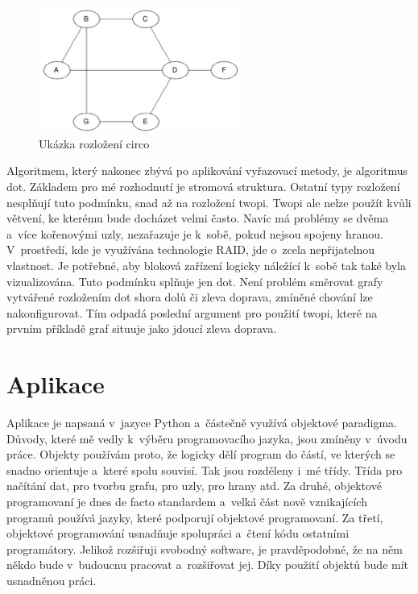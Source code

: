 \documentclass[printed,color,table,oneside,nolot,nolof]{fithesis}
\begin{document}
\begin{figure}[h!]
	\label{Ukázka rozložení circo}
	\caption{Ukázka rozložení circo}
	\centering
	\includegraphics[width=0.6\textwidth]{pictures/circo_example.png} 
\end{figure}

	Algoritmem, který nakonec zbývá po aplikování vyřazovací metody, je algoritmus dot. 
	Základem pro mé rozhodnutí je stromová struktura. Ostatní typy rozložení nesplňují tuto podmínku, snad až na rozložení twopi. Twopi ale nelze použít kvůli větvení,
	ke kterému bude docházet velmi často. Navíc má problémy se dvěma a~více kořenovými uzly, nezařazuje je k~sobě, pokud nejsou spojeny hranou. V~prostředí, kde je využívána technologie
	RAID, jde o~zcela nepřijatelnou vlastnost. Je potřebné, aby bloková zařízení logicky náležící k~sobě tak také byla vizualizována. Tuto podmínku splňuje 
	jen dot. Není problém směrovat grafy 
	vytvářené rozložením dot shora dolů či zleva doprava, zmíněné chování lze nakonfigurovat. Tím odpadá poslední argument pro použití twopi, které na prvním příkladě graf situuje jako
	jdoucí zleva doprava.

\chapter{Aplikace}
	Aplikace je napsaná v~jazyce Python a~částečně využívá objektové paradigma. Důvody, které mě vedly k~výběru programovacího jazyka, jsou zmíněny v~úvodu práce. Objekty používám proto, že logicky
	dělí program do částí, ve kterých se snadno orientuje a~které spolu souvisí. Tak jsou rozděleny i~mé třídy. Třída pro načítání dat, pro tvorbu grafu, pro uzly, pro hrany atd.
	Za druhé, objektové programovaní je dnes de facto standardem a~velká část nově vznikajících programů používá jazyky, které podporují objektové programovaní. Za třetí,
	objektové programování usnadňuje spolupráci a~čtení kódu ostatními programátory. Jelikož rozšiřuji svobodný software, je pravděpodobné, že na něm někdo bude v~budoucnu pracovat
	a~rozšiřovat jej. Díky použití objektů bude mít usnadněnou práci.
	
\end{document}
